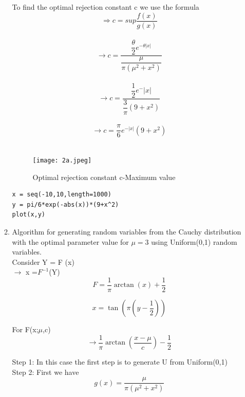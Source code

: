 \documentclass[letterpaper]{article}
\begin{document}
\begin{enumerate}
\begin{enumerate}
To find the optimal rejection constant c we use the formula
\begin{equation*}
\Rightarrow c=sup\dfrac{f(x)}{g(x)}
\end{equation*}\\

\begin{equation*}
\rightarrow c = \dfrac{\dfrac{\theta}{2}e^{-\theta |x|}}{\dfrac{\mu}{\pi(\mu^2 + x^2)}}
\end{equation*}\\

\begin{equation*}
\rightarrow c= \dfrac{\dfrac{1}{2} e^-|x|}{\dfrac{3}{\pi}(9+x^2)}
\end{equation*}\\

\begin{equation*}
\rightarrow c = \dfrac{\pi}{6}e^{-|x|}(9+x^2)
\end{equation*}\\

\begin{figure}[h]
    \centering
     \texttt{[image: 2a.jpeg]}
      \caption{ Optimal rejection constant c-Maximum value }
        \label{Figure 2}
\end{figure}


\begin{verbatim}
x = seq(-10,10,length=1000)
y = pi/6*exp(-abs(x))*(9+x^2)
plot(x,y)
\end{verbatim}

\item Algorithm for generating random variables from the Cauchy distribution with the optimal parameter value for $\mu=3$ using Uniform(0,1) random variables.\\
Consider Y = F (x)\\
$\rightarrow$ x =$ F^{-1}$(Y)\\
\begin{equation*}
 F = \dfrac{1}{\pi} \arctan(x) + \dfrac{1}{2}
\end{equation*}

\begin{equation*}
 x =\tan(\pi(y-\dfrac{1}{2}))
\end{equation*}

For F(x;$\mu$,c)
\begin{equation*}
\rightarrow \dfrac{1}{\pi}\arctan(\dfrac{x-\mu}{c})-\dfrac{1}{2}
\end{equation*}

Step 1: In this case the first step is to generate U from Uniform(0,1)\\
Step 2: First we have 
\begin{equation*}
g(x)=\dfrac{\mu}{\pi(\mu^2 + x^2)}
\end {equation*}\\
 

\end{enumerate}
\end{enumerate}
\end{document}
